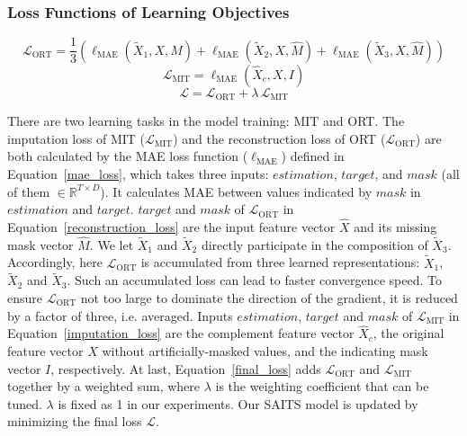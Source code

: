 \documentclass{article}
\begin{document}
\subsubsection{Loss Functions of Learning Objectives} \label{SAITS: training loss}
\begin{equation}
	\label{reconstruction_loss}
	\mathcal{L}_\text{ORT} = \frac{1}{3} \left(
	\ell_{\text{MAE}}\left(\tilde{X}_1, X, \hat{M}\right)
	+ \ell_{\text{MAE}}\left(\tilde{X}_2, X, \hat{M}\right)
	+ \ell_{\text{MAE}}\left(\tilde{X}_3, X, \hat{M}\right) 
	\right)
\end{equation}
\begin{equation}
	\label{imputation_loss}
	\mathcal{L}_\text{MIT} = \ell_{\text{MAE}}\left(\hat{X}_c, X, I\right) 
\end{equation}
\begin{equation}
	\label{final_loss}
	\mathcal{L} = \mathcal{L}_\text{ORT} + \lambda \, \mathcal{L}_\text{MIT}
\end{equation}

There are two learning tasks in the model training: MIT and ORT. The imputation loss of MIT ($\mathcal{L}_\text{MIT}$) and the reconstruction loss of ORT ($\mathcal{L}_\text{ORT}$) are both calculated by the MAE loss function ($\ell_{\text{MAE}}$) defined in Equation~\ref{mae_loss}, which takes three inputs: $estimation$, $target$, and $mask$ (all of them $\in \mathbb{R}^{T \times D}$). It calculates MAE between values indicated by $mask$ in $estimation$ and $target$. $target$ and $mask$ of $\mathcal{L}_\text{ORT}$ in Equation~\ref{reconstruction_loss} are the input feature vector $\hat{X}$ and its missing mask vector $\hat{M}$. We let $\tilde{X}_1$ and $\tilde{X}_2$ directly participate in the composition of $\tilde{X}_3$. Accordingly, here $\mathcal{L}_\text{ORT}$ is accumulated from three learned representations: $\tilde{X}_1$, $\tilde{X}_2$ and $\tilde{X}_3$. Such an accumulated loss can lead to faster convergence speed. To ensure $\mathcal{L}_\text{ORT}$ not too large to dominate the direction of the gradient, it is reduced by a factor of three, i.e. averaged. Inputs $estimation$, $target$ and $mask$ of $\mathcal{L}_\text{MIT}$ in Equation~\ref{imputation_loss} are the complement feature vector $\hat{X}_c$, the original feature vector $X$ without artificially-masked values, and the indicating mask vector $I$, respectively. At last, Equation~\ref{final_loss} adds $\mathcal{L}_\text{ORT}$ and $\mathcal{L}_\text{MIT}$ together by a weighted sum, where $\lambda$ is the weighting coefficient that can be tuned. $\lambda$ is fixed as 1 in our experiments. Our SAITS model is updated by minimizing the final loss $\mathcal{L}$.
\end{document}
